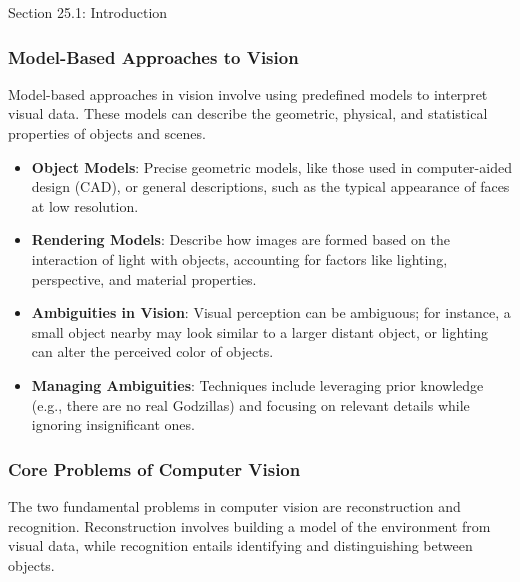 \begin{notes}{Section 25.1: Introduction}
\begin{highlight}
    \end{highlight}
    
    \subsubsection*{Model-Based Approaches to Vision}
    
    Model-based approaches in vision involve using predefined models to interpret visual data. These models can describe the geometric, physical, and statistical properties of objects and scenes.
    
    \begin{highlight}
    
        \begin{itemize}
            \item \textbf{Object Models}: Precise geometric models, like those used in computer-aided design (CAD), or general descriptions, such as the typical appearance of faces at low resolution.
            \item \textbf{Rendering Models}: Describe how images are formed based on the interaction of light with objects, accounting for factors like lighting, perspective, and material properties.
            \item \textbf{Ambiguities in Vision}: Visual perception can be ambiguous; for instance, a small object nearby may look similar to a larger distant object, or lighting can alter the perceived color of objects.
            \item \textbf{Managing Ambiguities}: Techniques include leveraging prior knowledge (e.g., there are no real Godzillas) and focusing on relevant details while ignoring insignificant ones.
        \end{itemize}
    
    \end{highlight}
    
    \subsubsection*{Core Problems of Computer Vision}
    
    The two fundamental problems in computer vision are reconstruction and recognition. Reconstruction involves building a model of the environment from visual data, while recognition entails identifying and 
    distinguishing between objects.
    
    \begin{highlight}
    

\end{highlight}
\end{notes}
